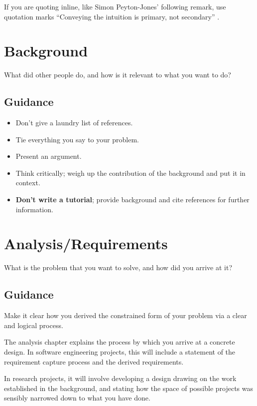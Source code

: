 \documentclass{l4proj}
\begin{document}
If you are quoting inline, like Simon Peyton-Jones' following remark, use quotation marks ``Conveying the intuition is primary, not
secondary'' \citep{Pey17}.


\chapter{Background}
What did other people do, and how is it relevant to what you want to do?
\section{Guidance}
\begin{itemize}    
    \item
      Don't give a laundry list of references.
    \item
      Tie everything you say to your problem.
    \item
      Present an argument.
    \item Think critically; weigh up the contribution of the background and put it in context.    
    \item
      \textbf{Don't write a tutorial}; provide background and cite
      references for further information.
\end{itemize}

\chapter{Analysis/Requirements}
What is the problem that you want to solve, and how did you arrive at it?
\section{Guidance}
Make it clear how you derived the constrained form of your problem via a clear and logical process. 

The analysis chapter explains the process by which you arrive at a concrete design. In software 
engineering projects, this will include a statement of the requirement capture process and the
derived requirements.

In research projects, it will involve developing a design drawing on
the work established in the background, and stating how the space of possible projects was
sensibly narrowed down to what you have done.
\end{document}

